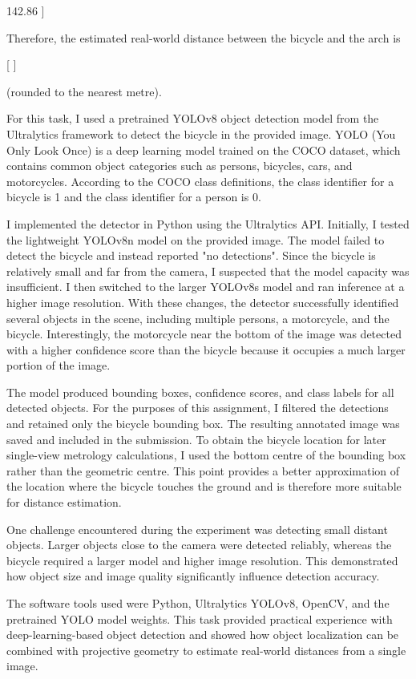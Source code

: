 \begin{studentSpace}
142.86
]

Therefore, the estimated real-world distance between the bicycle and the arch is

[
]

(rounded to the nearest metre).

 For this task, I used a pretrained YOLOv8 object detection model from the Ultralytics framework to detect the bicycle in the provided image. YOLO (You Only Look Once) is a deep learning model trained on the COCO dataset, which contains common object categories such as persons, bicycles, cars, and motorcycles. According to the COCO class definitions, the class identifier for a bicycle is 1 and the class identifier for a person is 0.

I implemented the detector in Python using the Ultralytics API. Initially, I tested the lightweight YOLOv8n model on the provided image. The model failed to detect the bicycle and instead reported "no detections". Since the bicycle is relatively small and far from the camera, I suspected that the model capacity was insufficient. I then switched to the larger YOLOv8s model and ran inference at a higher image resolution. With these changes, the detector successfully identified several objects in the scene, including multiple persons, a motorcycle, and the bicycle. Interestingly, the motorcycle near the bottom of the image was detected with a higher confidence score than the bicycle because it occupies a much larger portion of the image.

The model produced bounding boxes, confidence scores, and class labels for all detected objects. For the purposes of this assignment, I filtered the detections and retained only the bicycle bounding box. The resulting annotated image was saved and included in the submission. To obtain the bicycle location for later single-view metrology calculations, I used the bottom centre of the bounding box rather than the geometric centre. This point provides a better approximation of the location where the bicycle touches the ground and is therefore more suitable for distance estimation.

One challenge encountered during the experiment was detecting small distant objects. Larger objects close to the camera were detected reliably, whereas the bicycle required a larger model and higher image resolution. This demonstrated how object size and image quality significantly influence detection accuracy.

The software tools used were Python, Ultralytics YOLOv8, OpenCV, and the pretrained YOLO model weights. This task provided practical experience with deep-learning-based object detection and showed how object localization can be combined with projective geometry to estimate real-world distances from a single image.

\end{studentSpace}


